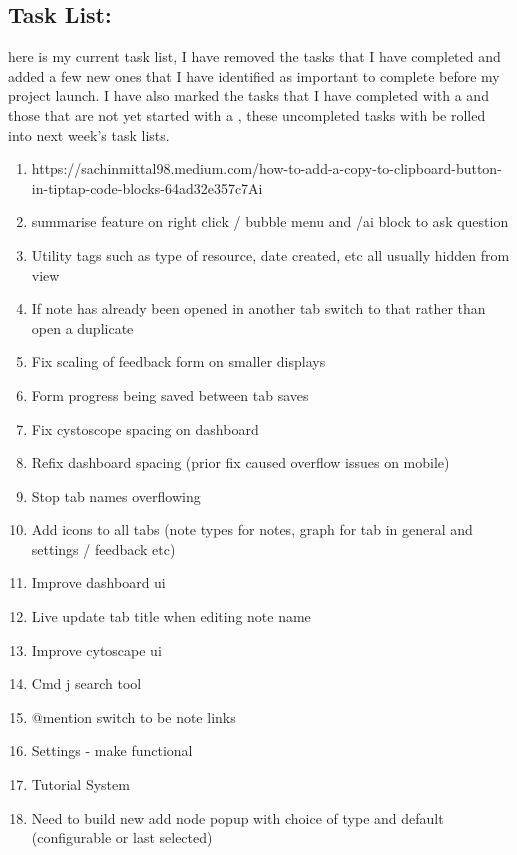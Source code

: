 \subsection*{Task List:}
here is my current task list, I have removed the tasks that I have completed and added a few new ones that I have identified as important to complete before my project launch. I have also marked the tasks that I have completed with a  and those that are not yet started with a , these uncompleted tasks with be rolled into next week's task lists. 
\begin{enumerate}
    \item https://sachinmittal98.medium.com/how-to-add-a-copy-to-clipboard-button-in-tiptap-code-blocks-64ad32e357c7Ai 
    \item summarise feature on right click / bubble menu and /ai block to ask question 
    \item Utility tags such as type of resource, date created,  etc all usually hidden from view 
    \item If note has already been opened in another tab switch to that rather than open a duplicate 
    \item Fix scaling of feedback form on smaller displays 
    \item Form progress being saved between tab saves 
    \item Fix cystoscope spacing on dashboard 
    \item Refix dashboard spacing (prior fix caused overflow issues on mobile) 
    \item Stop tab names overflowing 
    \item Add icons to all tabs (note types for notes, graph for tab in general and settings / feedback etc) 
    \item Improve dashboard ui 
    \item Live update tab title when editing note name
    \item Improve cytoscape ui 
    \item Cmd j search tool 
    \item @mention switch to be note links 
    \item Settings - make functional 
    \item Tutorial System 
    \item Need to build new add node popup with choice of type and default (configurable or last selected) 

\end{enumerate}

